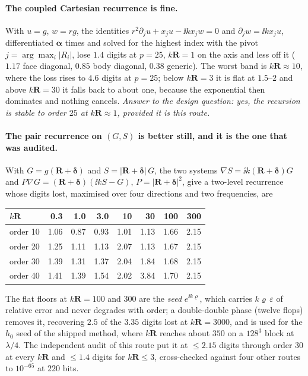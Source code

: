 \paragraph{The coupled Cartesian recurrence is fine.} With $u = g$, $w = rg$, the identities
$r^2\partial_j u + x_j u - \ii k x_j w = 0$ and $\partial_j w = \ii k x_j u$, differentiated
$\boldsymbol\alpha$ times and solved for the highest index with the pivot
$j = \arg\max_i|R_i|$, lose $1.4$ digits at $p = 25$, $k\mathbf{R} = 1$ on the axis and less
off it ($1.17$ face diagonal, $0.85$ body diagonal, $0.38$ generic). The worst band is
$k\mathbf{R} \approx 10$, where the loss rises to $4.6$ digits at $p = 25$; below
$k\mathbf{R} = 3$ it is flat at $1.5$--$2$ and above $k\mathbf{R} = 30$ it falls back to
about one, because the exponential then dominates and nothing cancels. \emph{Answer to the
design question: yes, the  recursion is stable to order $25$ at
$k\mathbf{R} \approx 1$, provided it is this route.}

\paragraph{The pair recurrence on $(G,S)$ is better still, and it is the one that was
audited.} With $G = g(\mathbf{R}+\boldsymbol\delta)$ and
$S = |\mathbf{R}+\boldsymbol\delta|\,G$, the two systems
$\nabla S = \ii k(\mathbf{R}+\boldsymbol\delta)G$ and
$P\nabla G = (\mathbf{R}+\boldsymbol\delta)(\ii kS - G)$, $P = |\mathbf{R}+\boldsymbol\delta|^2$,
give a two-level recurrence whose  digits lost, maximised over four directions
and two frequencies, are

\begin{center}\small
\begin{tabular}{@{}lrrrrrrr@{}}
\toprule
$k\mathbf{R}$ & 0.3 & 1.0 & 3.0 & 10 & 30 & 100 & 300\\
\midrule
order 10 & 1.06 & 0.87 & 0.93 & 1.01 & 1.13 & 1.66 & 2.15\\
order 20 & 1.25 & 1.11 & 1.13 & 2.07 & 1.13 & 1.67 & 2.15\\
order 30 & 1.39 & 1.31 & 1.37 & 2.04 & 1.84 & 1.68 & 2.15\\
order 40 & 1.41 & 1.39 & 1.54 & 2.02 & 3.84 & 1.70 & 2.15\\
\bottomrule
\end{tabular}
\end{center}

\noindent
The flat floors at $k\mathbf{R} = 100$ and $300$ are the \emph{seed} $e^{\ii k\varrho}$,
which carries $k\varrho\,\varepsilon$ of relative error and never degrades with order; a
double-double phase (twelve flops) removes it, recovering $2.5$ of the $3.35$ digits lost at
$k\mathbf{R} = 3000$, and is used for the $h_0$ seed of the shipped method, where
$k\mathbf{R}$ reaches about $350$ on a $128^3$ block at $\lambda/4$. The independent audit of
this route put it at $\le 2.15$ digits through order $30$ at every $k\mathbf{R}$ and
$\le 1.4$ digits for $k\mathbf{R} \le 3$, cross-checked against four other routes to
$10^{-65}$ at $220$ bits.

